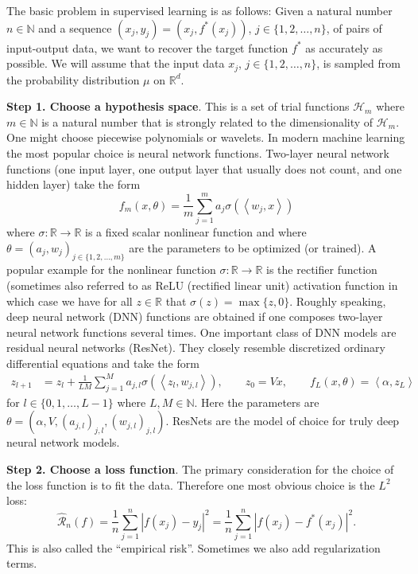 \documentclass[12pt,AutoFakeBold,AutoFakeSlant]{article}
\theoremstyle{definition}
\newcommand{\R}{\mathbb{R}}
\newcommand{\N}{\mathbb{N}}
\newcommand{\cH}{\mathcal{H}}
\newcommand{\bx}{{x}}
\begin{document}
	The basic problem in supervised learning is as follows:
	Given a natural number $ n \in \N $
	and a sequence 
	$ ( \bx_j, y_j ) = ( \bx_j , f^*( \bx_j ) ) $,
	$ j \in \{ 1, 2, \dots, n \} $, 
	of pairs of input-output data,  
	we want to  recover the target function $ f^* $ as accurately as possible. 
	We will assume that the input data $ \bx_j $, $ j \in \{ 1, 2, \dots, n \} $, 
	is sampled from the probability distribution $ \mu $ on $ \R^d $.

	{\bf Step 1. Choose a hypothesis space}. This is a set of trial functions $ \cH_m $
	where $ m \in \N $ is a natural number that is strongly related to the dimensionality of $\cH_m$.
	One might choose piecewise polynomials or wavelets.
	In modern machine learning the most popular  choice is neural network functions.
	Two-layer neural network functions (one input layer, one output layer that usually does not count, and one hidden layer) take the form 
	\begin{equation}
	f_m(\bx,  \theta) =
	\frac 1 m \sum_{ j = 1 }^m a_j \sigma( \left< w_j , x \right> )
	\end{equation}
	where $ \sigma \colon \R \to \R $ is a fixed scalar nonlinear function 
	and where $ \theta = ( a_j, w_j )_{ j \in \{ 1, 2, \dots, m \} } $ are the parameters to be optimized (or trained). 
	A popular example for the nonlinear function $ \sigma \colon \R \to \R $ is the rectifier function (sometimes also referred to 
	as ReLU (rectified linear unit) activation function in which case we have for all 
	$ z \in \R $ that 
	$ \sigma(z) = \max\{ z, 0 \} $. 
	Roughly speaking, deep neural network (DNN) functions are obtained if one composes two-layer neural network functions several times.
	One important class of DNN models are residual neural networks (ResNet). They closely resemble discretized 
	ordinary differential equations and take the form 
	\begin{align}
	\label{ResNet}
	z_{l+1} & = z_l + \frac 1 {LM} \sum_{j=1}^M a_{j,l}\sigma( \left< z_l, w_{j,l} \right> ), 
	\qquad
	z_0 = V{\bx}, 
	\qquad
	f_L(\bx, \theta) = \left< \alpha, z_L \right>
	\end{align}
	for $ l \in \{ 0, 1, \dots, L - 1 \} $ where $ L, M \in \N $. 
	Here the parameters are 
	$ 
	\theta 
	= ( \alpha, V, 
		( a_{j,l} )_{ j, l } 
		, 
		( w_{ j, l } )_{ j, l }
	) 
	$.
	ResNets are the model of choice for truly deep neural network models. 


	{\bf Step 2. Choose a loss function}. The primary consideration for the
	choice of the loss function is to fit the data.  Therefore one most obvious
	choice is the $L^2$ loss:
	\begin{equation}
	\hat{\mathcal{R}}_n(f) = \frac1n \sum_{j=1}^n | f(\bx_j) - y_j |^2 = \frac 1n \sum_{j=1}^n | f(\bx_j) - f^*(\bx_j) |^2.
	\label{empirical-risk}
	\end{equation}
	This is also called the ``empirical risk''.
	Sometimes we also add regularization terms.
\end{document}
